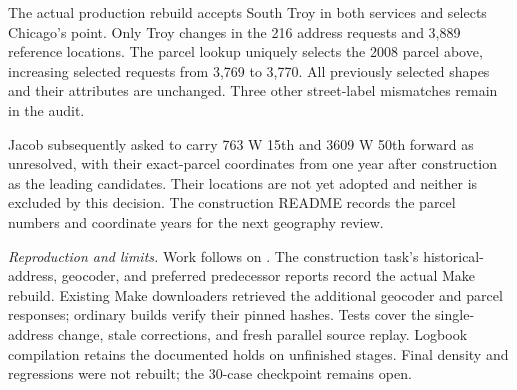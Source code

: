 The actual production rebuild accepts South Troy in both services and selects
Chicago's point. Only Troy changes in the 216 address requests and 3,889 reference
locations. The parcel lookup uniquely selects the 2008 parcel above, increasing
selected requests from 3,769 to 3,770. All previously selected shapes and their
attributes are unchanged. Three other street-label mismatches remain in the audit.

Jacob subsequently asked to carry 763 W 15th and 3609 W 50th forward as unresolved,
with their exact-parcel coordinates from one year after construction as the leading
candidates. Their locations are not yet adopted and neither is excluded by this
decision. The construction README records the parcel numbers and coordinate years
for the next geography review.

\textit{Reproduction and limits.} Work follows  on
. The construction task's historical-address,
geocoder, and preferred predecessor reports record the actual Make rebuild.
Existing Make downloaders retrieved the additional geocoder and parcel responses;
ordinary builds verify their pinned hashes. Tests cover the single-address change,
stale corrections, and fresh parallel source replay. Logbook compilation retains
the documented holds on unfinished stages. Final density and regressions were not
rebuilt; the 30-case checkpoint remains open.
